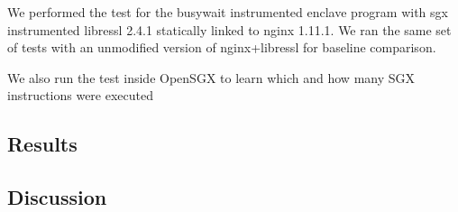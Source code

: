\documentclass[../main.tex]{subfiles}
\begin{document}
We performed the test for the busywait instrumented enclave program with sgx
instrumented libressl 2.4.1 statically linked to nginx 1.11.1. We ran the same
set of tests with an unmodified version of nginx+libressl for baseline
comparison.

We also run the test inside OpenSGX to learn which and how many SGX
instructions were executed

\subsection{Results}


\subsection{Discussion}
\end{document}
